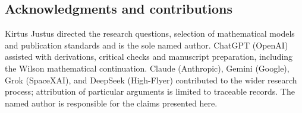 \documentclass[
  10pt,
  a4paper,
]{article}
\begin{document}
\subsection{Acknowledgments and contributions}\label{acknowledgments-and-contributions}

Kirtus Justus directed the research questions, selection of mathematical models and publication standards and is the sole named author. ChatGPT (OpenAI) assisted with derivations, critical checks and manuscript preparation, including the Wilson mathematical continuation. Claude (Anthropic), Gemini (Google), Grok (SpaceXAI), and DeepSeek (High-Flyer) contributed to the wider research process; attribution of particular arguments is limited to traceable records. The named author is responsible for the claims presented here.
\end{document}
